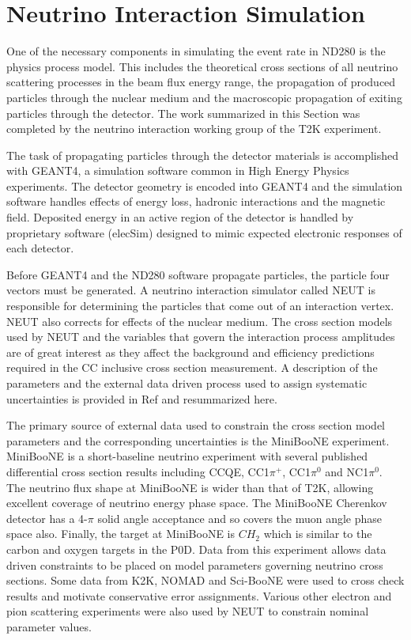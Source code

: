 \section{Neutrino Interaction Simulation}
\label{sec:evsim}

One of the necessary components in simulating the event rate in ND280 is the physics process model. This includes the theoretical cross sections of all neutrino scattering processes in the beam flux energy range, the propagation of produced particles through the nuclear medium and the macroscopic propagation of exiting particles through the detector. The work summarized in this Section was completed by the neutrino interaction working group of the T2K experiment.

The task of propagating particles through the detector materials is accomplished with GEANT4, a simulation software common in High Energy Physics experiments. The detector geometry is encoded into GEANT4 and the simulation software handles effects of energy loss, hadronic interactions and the magnetic field. Deposited energy in an active region of the detector is handled by proprietary software (elecSim) designed to mimic expected electronic responses of each detector. 

Before GEANT4 and the ND280 software propagate particles, the particle four vectors must be generated. A neutrino interaction simulator called NEUT\cite{neut} is responsible for determining the particles that come out of an interaction vertex. NEUT also corrects for effects of the nuclear medium. The cross section models used by NEUT and the variables that govern the interaction process amplitudes are of great interest as they affect the background and efficiency predictions required in the CC inclusive cross section measurement. A description of the parameters and the external data driven process used to assign systematic uncertainties is provided in Ref\cite{xsectn} and resummarized here.

The primary source of external data used to constrain the cross section model parameters and the corresponding uncertainties is the MiniBooNE experiment. MiniBooNE is a short-baseline neutrino experiment with several published differential cross section results including CCQE, CC1$\pi^+$, CC1$\pi^0$ and NC1$\pi^0$. The neutrino flux shape at MiniBooNE is wider than that of T2K, allowing excellent coverage of neutrino energy phase space. The MiniBooNE Cherenkov detector has a 4-$\pi$ solid angle acceptance and so covers the muon angle phase space also. Finally, the target at MiniBooNE is $CH_2$ which is similar to the carbon and oxygen targets in the P0D. Data from this experiment allows data driven constraints to be placed on model parameters governing neutrino cross sections. Some data from K2K, NOMAD and Sci-BooNE were used to cross check results and motivate conservative error assignments. Various other electron and pion scattering experiments were also used by NEUT to constrain nominal parameter values.

